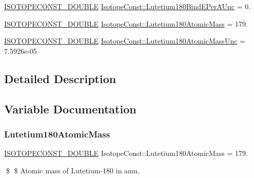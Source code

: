 \begin{DoxyCompactItemize}
\mbox{\hyperlink{group___isotope_const-_macros_ga8f45a7272ce02c0b4c65c44636ed719a}{I\+S\+O\+T\+O\+P\+E\+C\+O\+N\+S\+T\+\_\+\+D\+O\+U\+B\+LE}} \mbox{\hyperlink{group___isotope_const-_lutetium-_lu180_ga9064bddfff41dabbdac02380ba94262e}{Isotope\+Const\+::\+Lutetium180\+Bind\+E\+Per\+A\+Unc}} = 0.
\item 
\mbox{\hyperlink{group___isotope_const-_macros_ga8f45a7272ce02c0b4c65c44636ed719a}{I\+S\+O\+T\+O\+P\+E\+C\+O\+N\+S\+T\+\_\+\+D\+O\+U\+B\+LE}} \mbox{\hyperlink{group___isotope_const-_lutetium-_lu180_ga468f029c5628943694faefcbbe445085}{Isotope\+Const\+::\+Lutetium180\+Atomic\+Mass}} = 179.
\item 
\mbox{\hyperlink{group___isotope_const-_macros_ga8f45a7272ce02c0b4c65c44636ed719a}{I\+S\+O\+T\+O\+P\+E\+C\+O\+N\+S\+T\+\_\+\+D\+O\+U\+B\+LE}} \mbox{\hyperlink{group___isotope_const-_lutetium-_lu180_ga65f4d22b91ae986e06806aed9fefc94f}{Isotope\+Const\+::\+Lutetium180\+Atomic\+Mass\+Unc}} = 7.\+5926e-\/05
\end{DoxyCompactItemize}


\subsection{Detailed Description}


\subsection{Variable Documentation}
\mbox{\label{group___isotope_const-_lutetium-_lu180_ga468f029c5628943694faefcbbe445085}} 
\subsubsection{\texorpdfstring{Lutetium180\+Atomic\+Mass}{Lutetium180AtomicMass}}
{\footnotesize\ttfamily \mbox{\hyperlink{group___isotope_const-_macros_ga8f45a7272ce02c0b4c65c44636ed719a}{I\+S\+O\+T\+O\+P\+E\+C\+O\+N\+S\+T\+\_\+\+D\+O\+U\+B\+LE}} Isotope\+Const\+::\+Lutetium180\+Atomic\+Mass = 179.}

\$ \$ Atomic mass of Lutetium-\/180 in amu. \mbox{\label{group___isotope_const-_lutetium-_lu180_ga65f4d22b91ae986e06806aed9fefc94f}} 
